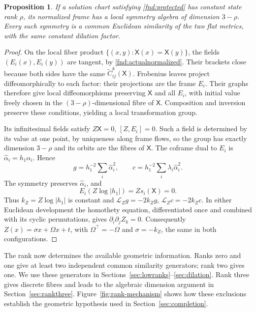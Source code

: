 \documentclass[11pt,a4paper]{article}
\numberwithin{equation}{section}
\theoremstyle{plain}
\newtheorem{proposition}[theorem]{Proposition}
\theoremstyle{definition}
\theoremstyle{remark}
\begin{document}
\begin{proposition}\label{fnd:symmetry}
If a solution chart satisfying \eqref{fnd:protected} has constant state rank $\rho$, its normalized frame has a local symmetry algebra of dimension $3-\rho$. Every such symmetry is a common Euclidean similarity of the two flat metrics, with the same constant dilation factor.
\end{proposition}
\begin{proof}
On the local fiber product $\{(x,y):\mathsf X(x)=\mathsf X(y)\}$, the fields $(E_i(x),E_i(y))$ are tangent, by \eqref{fnd:actualnormalized}. Their brackets close because both sides have the same $\widetilde C^k_{ij}(\mathsf X)$. Frobenius leaves project diffeomorphically to each factor: their projections are the frame $E_i$. Their graphs therefore give local diffeomorphisms preserving $\mathsf X$ and all $E_i$, with initial value freely chosen in the $(3-\rho)$-dimensional fibre of $\mathsf X$. Composition and inversion preserve these conditions, yielding a local transformation group.

Its infinitesimal fields satisfy $Z\mathsf X=0$, $[Z,E_i]=0$. Such a field is determined by its value at one point, by uniqueness along frame flows, so the group has exactly dimension $3-\rho$ and its orbits are the fibres of $\mathsf X$. The coframe dual to $E_i$ is $\widehat\alpha_i=h_1\alpha_i$. Hence
\begin{equation}\label{sim:metrics}
g=h_1^{-2}\sum_i\widehat\alpha_i^2,\qquad
c=h_1^{-2}\sum_i\lambda_i\widehat\alpha_i^2.
\end{equation}
The symmetry preserves $\widehat\alpha_i$, and
\[
E_i(Z\log|h_1|)=Zs_i(\mathsf X)=0.
\]
Thus $k_Z=Z\log|h_1|$ is constant and $\mathcal L_Zg=-2k_Zg$, $\mathcal L_Zc=-2k_Zc$. In either Euclidean development the homothety equation, differentiated once and combined with its cyclic permutations, gives $\partial_i\partial_jZ_k=0$. Consequently $Z(x)=\sigma x+\Omega x+t$, with $\Omega^{\top}=-\Omega$ and $\sigma=-k_Z$, the same in both configurations.
\end{proof}

The rank now determines the available geometric information.
Ranks zero and one give at least two independent common similarity
generators; rank two gives one. We use these generators in
Sections~\ref{sec:lowranks}--\ref{sec:dilation}. Rank three gives discrete
fibres and leads to the algebraic dimension argument in
Section~\ref{sec:rankthree}. Figure~\ref{fig:rank-mechanism} shows how
these exclusions establish the geometric hypothesis used in
Section~\ref{sec:completion}.
\end{document}
